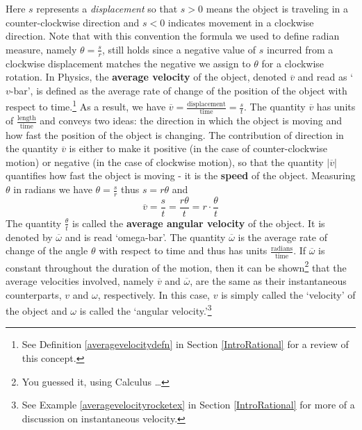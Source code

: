 Here $s$ represents a \textit{displacement} so that  $s > 0$ means the object is traveling in a counter-clockwise direction and $s<0$ indicates movement in a clockwise direction. Note that with this convention the formula we used to define radian measure, namely $\theta = \frac{s}{r}$, still holds since a negative value of $s$ incurred from a clockwise displacement matches the negative we assign to $\theta$ for a clockwise rotation.   In Physics, the \textbf{average velocity}  of the object, denoted $\overline{v}$ and read as `$v$-bar', is defined as the average rate of change of the position of the object with respect to time.\footnote{See Definition \ref{averagevelocitydefn} in Section \ref{IntroRational} for a review of this concept.} As a result, we have $\overline{v} = \frac{\text{displacement}}{\text{time}} = \frac{s}{t}$.  The quantity $\overline{v}$ has units of $\frac{\text{length}}{\text{time}}$ and conveys two ideas:  the direction in which the object is moving and how fast the position of the object is changing.  The contribution of direction in the quantity $\overline{v}$ is either to make it positive (in the case of counter-clockwise motion) or negative (in the case of clockwise motion), so that the quantity $\left| \overline{v} \right|$ quantifies how fast the object is moving - it is the \textbf{speed} of the object. Measuring $\theta$ in radians we have $\theta = \frac{s}{r}$ thus $s = r \theta$ and  \[ \overline{v} = \frac{s}{t} = \frac{r \theta}{t} = r \cdot \frac{\theta}{t} \] The quantity $\frac{\theta}{t}$ is called the \textbf{average angular velocity} of the object.  It is denoted by $\overline{\omega}$ and is read `omega-bar'.  The quantity $\overline{\omega}$ is the average rate of change of the angle $\theta$ with respect to time and thus has units $\frac{\text{radians}}{\text{time}}$. If $\overline{\omega}$ is constant throughout the duration of the motion, then it can be shown\footnote{You guessed it, using Calculus \ldots} that the average  velocities involved, namely $\overline{v}$ and $\overline{\omega}$, are the same as their instantaneous counterparts, $v$ and $\omega$, respectively.  In this case, $v$ is simply called the `velocity' of the object  and  $\omega$ is called the `angular velocity.'\footnote{See Example \ref{averagevelocityrocketex} in Section \ref{IntroRational} for more of a discussion on instantaneous velocity.}  
\smallskip


